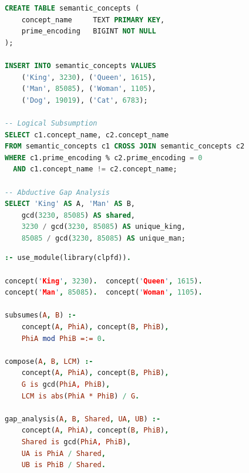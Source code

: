 \documentclass[10pt]{article}
\begin{document}
\begin{lstlisting}[language=SQL, caption={PostgreSQL: subsumption, composition, and gap analysis via prime encodings.}, label={lst:sql}]
CREATE TABLE semantic_concepts (
    concept_name     TEXT PRIMARY KEY,
    prime_encoding   BIGINT NOT NULL
);

INSERT INTO semantic_concepts VALUES
    ('King', 3230), ('Queen', 1615),
    ('Man', 85085), ('Woman', 1105),
    ('Dog', 19019), ('Cat', 6783);

-- Logical Subsumption
SELECT c1.concept_name, c2.concept_name
FROM semantic_concepts c1 CROSS JOIN semantic_concepts c2
WHERE c1.prime_encoding % c2.prime_encoding = 0
  AND c1.concept_name != c2.concept_name;

-- Abductive Gap Analysis
SELECT 'King' AS A, 'Man' AS B,
    gcd(3230, 85085) AS shared,
    3230 / gcd(3230, 85085) AS unique_king,
    85085 / gcd(3230, 85085) AS unique_man;
\end{lstlisting}

\begin{lstlisting}[language=Prolog, caption={SWI-Prolog: algebraic operations as logic predicates.}, label={lst:prolog}]
:- use_module(library(clpfd)).

concept('King', 3230).  concept('Queen', 1615).
concept('Man', 85085).  concept('Woman', 1105).

subsumes(A, B) :-
    concept(A, PhiA), concept(B, PhiB),
    PhiA mod PhiB =:= 0.

compose(A, B, LCM) :-
    concept(A, PhiA), concept(B, PhiB),
    G is gcd(PhiA, PhiB),
    LCM is abs(PhiA * PhiB) / G.

gap_analysis(A, B, Shared, UA, UB) :-
    concept(A, PhiA), concept(B, PhiB),
    Shared is gcd(PhiA, PhiB),
    UA is PhiA / Shared,
    UB is PhiB / Shared.
\end{lstlisting}
\end{document}
